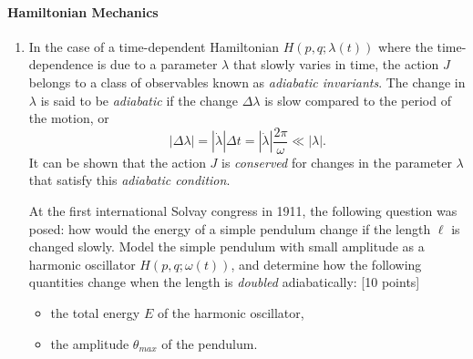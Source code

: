 \documentclass[letterpaper,11pt]{article}
\begin{document}
\paragraph*{Hamiltonian Mechanics}
\begin{enumerate}[resume]
 \item In the case of a time-dependent Hamiltonian $H\left(p,q;\lambda(t)\right)$ where the time-dependence is due to a parameter $\lambda$ that slowly varies in time, the action $J$ belongs to a class of observables known as \emph{adiabatic invariants}.  The change in $\lambda$ is said to be \emph{adiabatic} if the change $\Delta\lambda$ is slow compared to the period of the motion, or
 \begin{equation*}
  |\Delta\lambda| = |\dot\lambda| \Delta t = |\dot\lambda| \frac{2\pi}{\omega} \ll |\lambda|.
 \end{equation*}
 It can be shown that the action $J$ is \emph{conserved} for changes in the parameter $\lambda$ that satisfy this \emph{adiabatic condition}.

 At the first international Solvay congress in 1911, the following question was posed: how would the energy of a simple pendulum change if the length $\ell$ is changed slowly.  Model the simple pendulum with small amplitude as a harmonic oscillator $H\left(p,q;\omega(t)\right)$, and determine how the following quantities change when the length is \emph{doubled} adiabatically: [10 points]
 \begin{itemize}
  \item the total energy $E$ of the harmonic oscillator,
  \item the amplitude $\theta_{max}$ of the pendulum.
 \end{itemize}
\end{enumerate}
\end{document}

